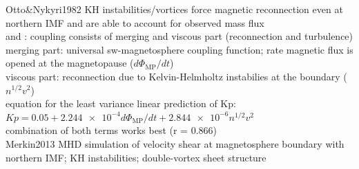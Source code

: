 Otto\&Nykyri1982 KH instabilities/vortices force magnetic reconnection even at northern IMF and are able to account for observed mass flux\\

\citet{Newell2007} and \citet{Newell2008}: coupling consists of merging and viscous part (reconnection and turbulence)\\
merging part: universal sw-magnetosphere coupling function; rate magnetic flux is opened at the magnetopause ($d\Phi_\text{MP}/dt$)\\
viscous part: reconnection due to Kelvin-Helmholtz instabilies at the boundary ($n^{1/2} v^2$)\\
equation for the least variance linear prediction of Kp: $Kp = 0.05 + \num{2.244e-4} d\Phi_\text{MP}/dt + \num{2.844e-6} n^{1/2} v^2$\\
combination of both terms works best (r = 0.866)\\

Merkin2013 MHD simulation of velocity shear at magnetosphere boundary with northern IMF; KH instabilities; double-vortex sheet structure\\




